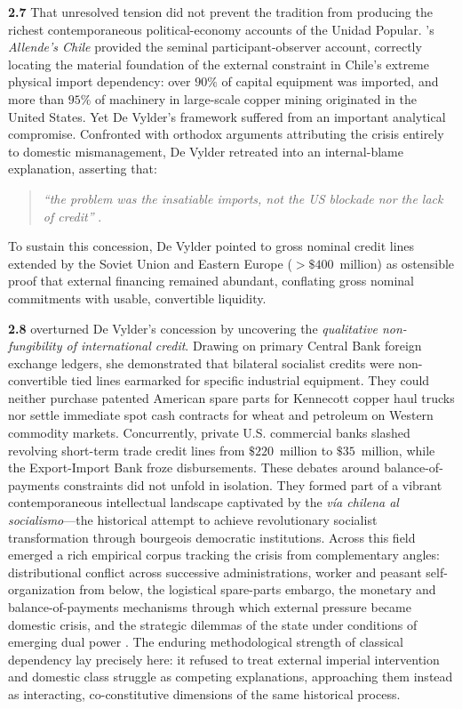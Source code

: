 \textbf{2.7} That unresolved tension did not prevent the tradition from producing the richest 
contemporaneous political-economy accounts of the Unidad Popular. \citet{DeVylder1976}'s \textit{Allende's Chile} 
provided the seminal participant-observer account, correctly locating the material foundation 
of the external constraint in Chile's extreme physical import dependency: over $90\%$ of capital 
equipment was imported, and more than $95\%$ of machinery in large-scale copper mining originated 
in the United States. Yet De Vylder's framework suffered from an important analytical compromise. 
Confronted with orthodox arguments attributing the crisis entirely to domestic mismanagement, 
De Vylder retreated into an internal-blame explanation, asserting that: 
\begin{quote}
	\emph{``the problem was the  insatiable imports, not the US blockade nor the lack of credit''} \citep[p.~106]{DeVylder1976}. 
\end{quote}

To sustain this concession, De Vylder pointed to gross nominal credit lines extended by the Soviet 
Union and Eastern Europe ($>\$400$~million) as ostensible proof that external financing remained 
abundant, conflating gross nominal commitments with usable, convertible liquidity.

\textbf{2.8} \citet{Stallings1978}  overturned De Vylder's concession by uncovering 
the \textit{qualitative non-fungibility of international credit}. Drawing on primary Central 
Bank foreign exchange ledgers, she demonstrated that bilateral socialist credits were 
non-convertible tied lines earmarked for specific industrial equipment. They could neither 
purchase patented American spare parts for Kennecott copper haul trucks nor settle immediate 
spot cash contracts for wheat and petroleum on Western commodity markets. Concurrently, private 
U.S. commercial banks slashed revolving short-term trade credit lines from $\$220$~million to 
$\$35$~million, while the Export-Import Bank froze disbursements. These debates around balance-of-payments constraints did not unfold in isolation. They formed part of a 
vibrant contemporaneous intellectual landscape captivated by the \textit{vía chilena al socialismo}---the 
historical attempt to achieve revolutionary socialist transformation through 
bourgeois democratic institutions. Across this field emerged a rich empirical corpus tracking 
the crisis from complementary angles: distributional conflict across successive administrations, 
worker and peasant self-organization from below, the logistical spare-parts embargo, the monetary 
and balance-of-payments mechanisms through which external pressure became domestic crisis, and 
the strategic dilemmas of the state under conditions of emerging dual power 
\citep{StallingsZimbalist1975,EspinosaZimbalist1978,Kay1978,PetrasMorley1975,GriffithJones1981,Sideri1979,SweezyMagdoff1974,ZavaletaMercado1974,Winn1986}.  The enduring methodological strength of classical dependency lay precisely here: it refused to  treat external imperial intervention and domestic class struggle as competing explanations,  approaching them instead as interacting, co-constitutive dimensions of the same historical process.

